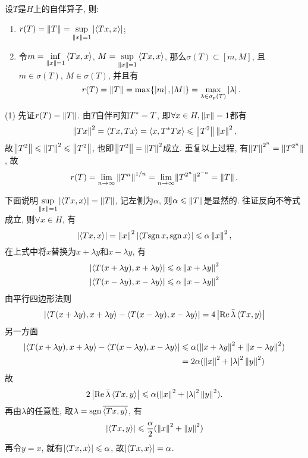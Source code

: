 \begin{Theorem}\label{thm:自伴算子的谱性质}
	设$ T $是$ H $上的自伴算子, 则:
	\begin{enumerate}[(1)]
		\item $ r(T)=\left\| T \right\|=\sup\limits_{\left\| x \right\|=1}\left| \left\langle Tx,x \right\rangle \right|  $;
		\item 令$ m=\inf\limits_{\left\| x \right\|=1}\left\langle Tx,x \right\rangle $, $ M=\sup\limits_{\left\| x \right\|=1}\left\langle Tx,x \right\rangle $, 那么$ \sigma(T)\subset[m,M] $, 且$ m\in\sigma(T) $, $ M\in\sigma(T) $, 并且有
		      \[
			      r(T)=\left\| T \right\|=\max\{\left| m \right| ,\left| M \right| \}=\max_{\lambda\in\sigma_p(T)}\left| \lambda \right| .
		      \]
	\end{enumerate}
\end{Theorem}
\begin{Proof}
	(1) 先证$ r(T)=\left\| T \right\| $. 由$ T $自伴可知$ T^{*}=T $, 即$ \forall x\in H,\left\| x \right\|=1 $都有
	\[
		\left\| Tx \right\|^2=\left\langle Tx,Tx \right\rangle=\left\langle x,T^{*}Tx \right\rangle\leqslant\left\| T^2 \right\|\left\| x \right\|^2,
	\]
	故$ \left\| T^2 \right\|\leqslant\left\| T \right\|^2\leqslant\left\| T^2 \right\| $, 也即$ \left\| T^2 \right\|=\left\| T \right\|^2 $成立. 重复以上过程, 有$ \left\| T \right\|^{2^n}=\lVert T^{2^n}\rVert $, 故
	\[
		r(T)=\lim_{n\to\infty}\left\| T^n \right\|^{1/n}=\lim_{n\to \infty}\lVert T^{2^n}\rVert^{2^{-n}}=\left\| T \right\|.
	\]

	下面说明$ \sup\limits_{\left\| x \right\|=1}\left| \left\langle Tx,x \right\rangle \right| =\left\| T \right\| $, 记左侧为$ \alpha $, 则$ \alpha\leqslant\left\| T \right\| $是显然的. 往证反向不等式成立, 则$ \forall x\in H $, 有
	\[
		\left| \left\langle Tx,x \right\rangle \right| =\left\| x \right\|^2\left| \left\langle T\mathrm{sgn}\, x,\mathrm{sgn}\, x \right\rangle \right| \leqslant\alpha\left\| x \right\|^2,
	\]
	在上式中将$ x $替换为$ x+\lambda y $和$ x-\lambda y $, 有
	\[
		\begin{aligned}
			\left| \left\langle T(x+\lambda y),x+\lambda y \right\rangle \right|  & \leqslant\alpha\left\| x+\lambda y \right\|^2 \\
			\left| \left\langle T(x-\lambda y),x-\lambda y \right\rangle \right|  & \leqslant\alpha\left\| x-\lambda y \right\|^2
		\end{aligned}
	\]
	由平行四边形法则
	\[
		\left| \left\langle T(x+\lambda y),x+\lambda y \right\rangle-\left\langle T(x-\lambda y),x-\lambda y \right\rangle \right| =4\left| \mathrm{Re\,}\bar{\lambda}\left\langle Tx,y \right\rangle \right| 
	\]
	另一方面
	\[
		\begin{aligned}
			\left| \left\langle T(x+\lambda y),x+\lambda y \right\rangle-\left\langle T(x-\lambda y),x-\lambda y \right\rangle \right|  & \leqslant\alpha(\left\| x+\lambda y \right\|^2+\left\| x-\lambda y \right\|^2) \\
			                                                                                & =2\alpha(\left\| x \right\|^2+\left| \lambda \right| ^2\left\| y \right\|^2)
		\end{aligned}
	\]
	故
	\[
		2\left| \mathrm{Re\,}\bar{\lambda}\left\langle Tx,y \right\rangle \right| \leqslant\alpha(\left\| x \right\|^2+\left| \lambda \right| ^2\left\| y \right\|^2).
	\]
	再由$ \lambda $的任意性, 取$ \lambda=\mathrm{sgn}\,\overline{\left\langle Tx,y \right\rangle} $, 有
	\[
		\left| \left\langle Tx,y \right\rangle \right| \leqslant\frac{\alpha}{2}(\left\| x \right\|^2+\left\| y \right\|^2)
	\]
	再令$ y=x $, 就有$ \left| \left\langle Tx,x \right\rangle \right| \leqslant\alpha $, 故$ \left| \left\langle Tx,x \right\rangle \right| =\alpha $.


\end{Proof}
